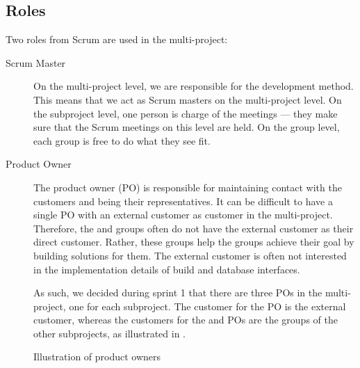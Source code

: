 \subsection{Roles}
Two roles from Scrum are used in the multi-project:

\begin{description}
  \item[Scrum Master] On the multi-project level, we are responsible for the development method. This means that we act as Scrum masters on the multi-project level. On the subproject level, one person is charge of the meetings --- they make sure that the Scrum meetings on this level are held. On the group level, each group is free to do what they see fit.
  \item[Product Owner] The product owner (PO) is responsible for maintaining contact with the customers and being their representatives. It can be difficult to have a single PO with an external customer as customer in the multi-project. Therefore, the \bd and \db groups often do not have the external customer as their direct customer. Rather, these groups help the \gui groups achieve their goal by building solutions for them. The external customer is often not interested in the implementation details of build and database interfaces.

As such, we decided during sprint 1 that there are three POs in the multi-project, one for each subproject. The customer for the \gui PO is the external customer, whereas the customers for the \db and \bd POs are the groups of the other subprojects, as illustrated in .

\end{description}

\begin{figure}%
\centering
{}
\caption{Illustration of product owners}%
\label{fig:po_illu}%
\end{figure}

